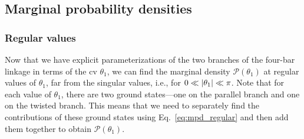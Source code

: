 \subsection{Marginal probability densities}

\subsubsection*{Regular values}

Now that we have explicit parameterizations of the two branches of the four-bar linkage in terms of the \ac{cv} $\theta_{1}$, we can find the marginal density $\mathscr{P}(\theta_{1})$ at regular values of $\theta_{1}$, far from the singular values, i.e., for $0 \ll \lvert\theta_{1}\rvert \ll \pi$.
Note that for each value of $\theta_{1}$, there are two ground states---one on the parallel branch and one on the twisted branch.
This means that we need to separately find the contributions of these ground states using Eq.~\eqref{eq:mpd_regular} and then add them together to obtain $\mathscr{P}(\theta_{1})$.

